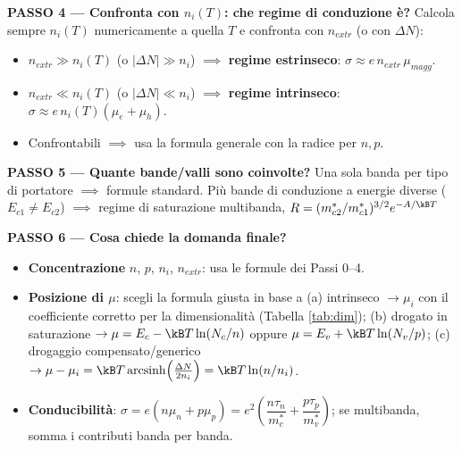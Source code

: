\textbf{PASSO 4 --- Confronta con $n_i(T)$: che regime di conduzione è?}
Calcola sempre $n_i(T)$ numericamente a quella $T$ e confronta con $n_{extr}$ (o con $\Delta N$):
\begin{itemize}
  \item $n_{extr}\gg n_i(T)$ (o $|\Delta N|\gg n_i$) $\implies$ \textbf{regime estrinseco}: $\sigma\approx e\,n_{extr}\,\mu_{magg}$.
  \item $n_{extr}\ll n_i(T)$ (o $|\Delta N|\ll n_i$) $\implies$ \textbf{regime intrinseco}: $\sigma\approx e\,n_i(T)(\mu_e+\mu_h)$.
  \item Confrontabili $\implies$ usa la formula generale con la radice per $n,p$.
\end{itemize}

\textbf{PASSO 5 --- Quante bande/valli sono coinvolte?}
Una sola banda per tipo di portatore $\implies$ formule standard. Più bande di conduzione a energie diverse ($E_{c1}\neq E_{c2}$) $\implies$ regime di saturazione multibanda, $R=(m_{c2}^*/m_{c1}^*)^{3/2}e^{-A/\kB T}$ 

\textbf{PASSO 6 --- Cosa chiede la domanda finale?}
\begin{itemize}
  \item \textbf{Concentrazione} $n$, $p$, $n_i$, $n_{extr}$: usa le formule dei Passi 0--4.
  \item \textbf{Posizione di $\mu$}: scegli la formula giusta in base a
  (a) intrinseco $\to\mu_i$ con il coefficiente corretto per la dimensionalità (Tabella \ref{tab:dim});
  (b) drogato in saturazione $\to\mu=E_c-\kB T\ln(N_c/n)$ oppure $\mu=E_v+\kB T\ln(N_v/p)$;
  (c) drogaggio compensato/generico $\to\mu-\mu_i=\kB T\,\mathrm{arcsinh}\!\left(\frac{\Delta N}{2n_i}\right)=\kB T\ln(n/n_i)$.
  \item \textbf{Conducibilità}: $\sigma=e(n\mu_n+p\mu_p)=e^2\!\left(\dfrac{n\tau_n}{m_c^*}+\dfrac{p\tau_p}{m_v^*}\right)$; se multibanda, somma i contributi banda per banda.
\end{itemize}



